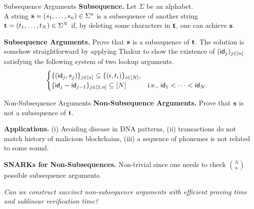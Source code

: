 \begin{frame}{Subsequence Arguments}
	\textbf{Subsequence.} Let $\Sigma$ be an alphabet. \\
	A string $\mathbf{s} = (s_1, \dots, s_n) \in \Sigma^n$ is a subsequence of another string $\mathbf{t} = (t_1, \dots, t_N) \in \Sigma^N$ if, by deleting some characters in $\mathbf{t}$, one can achieve $\mathbf{s}$.
	
	\textbf{Subsequence Arguments.} Prove that $\mathbf{s}$ is a subsequence of $\mathbf{t}$. The solution is somehow straightforward by applying Thakur \cite{EPRINT:Thakur23} to show the existence of $(\mathsf{id}_j)_{j \in [n]}$ satisfying the following system of two lookup arguments.
	\begin{equation*}
		\begin{cases}
			\{(\mathsf{id}_j, s_j)\}_{j \in [n]} \subseteq \{(i, t_i)\}_{i \in [N]},\\
			\{\mathsf{id}_j - \mathsf{id}_{j - 1}\}_{j \in [2, n]} \subseteq [N] &\text{i.e., $\mathsf{id}_1 < \dots < \mathsf{id}_N$}.
		\end{cases}
	\end{equation*}
\end{frame}

\begin{frame}{Non-Subsequence Arguments}
	\textbf{Non-Subsequence Arguments.} Prove that $\mathbf{s}$ is not a subsequence of $\mathbf{t}$.
	
	\textbf{Applications.} (i) Avoiding disease in DNA patterns, (ii) transactions do not match history of malicious blockchains, (iii) a sequence of phonemes is not related to some sound.
	
	\textbf{SNARKs for Non-Subsequences.} Non-trivial since one needs to check $\binom{N}{n}$ possible subsequence arguments.
	
	\begin{center}
		\emph{Can we construct succinct non-subsequence arguments with efficient proving time and sublinear verification time?}
	\end{center}
\end{frame}